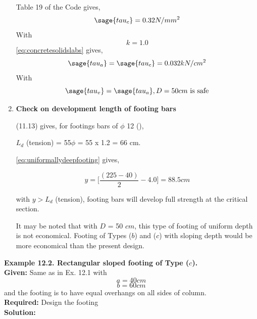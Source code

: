 \begin{enumerate}
Table 19 of the Code gives,
$$\sage{tau_c}=0.32N/mm^2$$
With
$$k = 1.0 $$
\equmacro \ref{eq:concretesolidslabs} gives, 
        $$\sage{tau_a}=\sage{tau_c}=0.032kN/cm^2$$
With        
$$\sage{tau_v}=\sage{tau_a}, D = 50 cm \text{ is safe}$$

\item  \textbf{Check on development length of footing bars}

\tablemacro (11.13) gives, for footings bars of $\phi$ 12 (\Fefouronefivemacro),

$L_d$ (tension) = 55$\phi$ = 55 x 1.2 = 66 cm.

\equmacro \ref{eq:uniformallydeepfooting} gives, 

$$y=\bigg[\frac{(225-40)}{2}-4.0\bigg]=88.5cm$$

with $y > L_d$ (tension), footing bars will develop full strength at the critical section.

It may be noted that with $D$ = 50 $cm$, this type of footing of uniform depth is not economical. 
Footing of Types ($b$) and ($c$) with sloping depth would be more economical than the present design.
\end{enumerate} %
\textbf{ Example 12.2. Rectangular sloped footing of Type ($c$).}\\
\textbf{Given:}
Same as in Ex. 12.1 with
$$a = 40 cm$$
$$b = 60 cm$$ 
and the footing is to have equal overhangs on all sides of column.\\
\textbf{Required:} Design the footing\\
\textbf{Solution:}

